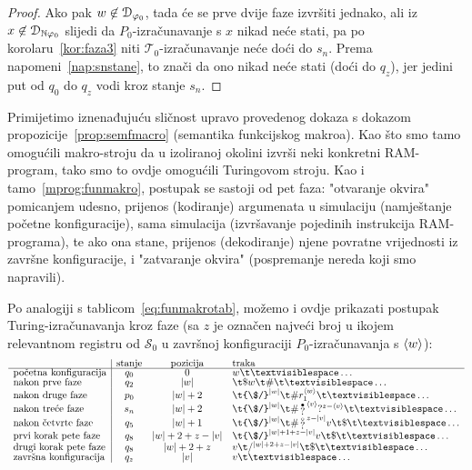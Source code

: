 \begin{proof}
Ako pak $w\not\in\mathcal D_{\varphi_0}$, tada će se prve dvije faze izvršiti jednako, ali iz $x\not\in\mathcal D_{{\mathbb N}\varphi_0}$ slijedi da $P_0$-izračunavanje s $x$ nikad neće stati, pa po korolaru~\ref{kor:faza3} niti $\mathcal T_0$-izračunavanje neće doći do $s_n$. Prema napomeni~\ref{nap:snstane}, to znači da ono nikad neće stati (doći do $q_z$), jer jedini put od $q_0$ do $q_z$ vodi kroz stanje $s_n$.
\end{proof}

Primijetimo iznenađujuću sličnost upravo provedenog dokaza s dokazom propozicije~\ref{prop:semfmacro} (semantika funkcijskog makroa). Kao što smo tamo omogućili makro-stroju da u izoliranoj okolini izvrši neki konkretni RAM-program, tako smo to ovdje omogućili Turingovom stroju. Kao i tamo~\eqref{mprog:funmakro}, postupak se sastoji od pet faza: "otvaranje okvira" pomicanjem udesno, prijenos (kodiranje) argumenata u simulaciju (namještanje početne konfiguracije), sama simulacija (izvršavanje pojedinih instrukcija RAM-programa), te ako ona stane, prijenos (dekodiranje) njene povratne vrijednosti iz završne konfiguracije, i "zatvaranje okvira" (pospremanje nereda koji smo napravili).

Po analogiji s tablicom~\eqref{eq:funmakrotab}, možemo i ovdje prikazati postupak Turing-iz\-ra\-ču\-na\-va\-nja kroz faze (sa $z$ je označen najveći broj u ikojem relevantnom registru od $\mathcal S_0$ u završnoj konfiguraciji $P_0$-izračunavanja s $\langle w\rangle$):
\begin{equation}
\begin{array}{l|ccl}
                             &\text{stanje}&\text{pozicija}&\text{traka}\\\hline
\text{početna konfiguracija} & q_0 & 0         & w\bl\ldots \\
\text{nakon prve faze}       & q_2 & \dulj w   & \t\$w\t\#\bl\ldots \\
\text{nakon druge faze}      & p_0 & \dulj w+2 & \t{\$/}^{\dulj w}\t\#r_1^{\kr w}\bl\ldots \\
\text{nakon treće faze}      & s_n & \dulj w+2 & \renewcommand{\arraystretch}{0.1}
    \t{\$/}^{\dulj w}\t\#\begin{array}{@{}c@{}}\text\textbullet\\?\end{array}^{\kr{v}}?^{z-\kr{v}}\bl\ldots\\
\text{nakon četvrte faze}    & q_5 & \dulj w+1 &
\renewcommand{\arraystretch}{0.1}
\t{\$/}^{\dulj w}\t\#\begin{array}{@{}c@{}}\text\textopenbullet\\?\end{array}^{z-\dulj v}v\t\$\bl\ldots\\
\text{prvi korak pete faze} & q_8 & \dulj w+2+z-\dulj v       & \t{\$/}^{\dulj w+1+z-\dulj v}v\t\$\bl\ldots\\
\text{drugi korak pete faze}& q_8 & \dulj w+2+z & v\t/^{\dulj w+2+z-\dulj v}\t\$\bl\ldots\\
\text{završna konfiguracija} & q_z & \dulj v   & v\bl\ldots
\end{array}
\end{equation}

